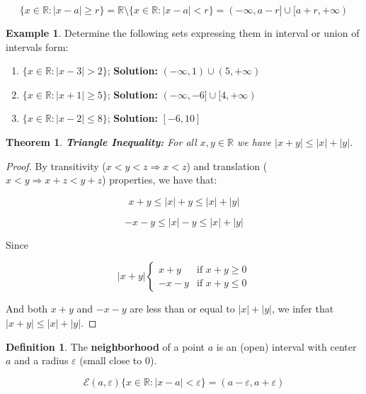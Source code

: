 \documentclass[a4paper,11pt]{article}
\theoremstyle{definition}
\newtheorem{definition}{Definition}
\newtheorem{example}{Example}
\theoremstyle{plain}
\newtheorem{theorem}{Theorem}
\begin{document}
\[
\{x\in\mathbb{R} : \lvert x-a \rvert \geq r\} = \mathbb{R}\setminus\{x\in\mathbb{R}: \lvert x-a \rvert < r\} = (-\infty,a-r]\cup[a+r,+\infty)
\]

\begin{example}
Determine the following sets expressing them in
interval or union of intervals form:
\end{example}

\begin{enumerate}
\def\labelenumi{\arabic{enumi}.}
\item
  \(\{x\in\mathbb{R} : \lvert x-3\rvert > 2\}\); \textbf{Solution:}
  \((-\infty,1)\cup(5,+\infty)\)
\item
  \(\{x\in\mathbb{R} : \lvert x+1\rvert \geq 5\}\); \textbf{Solution:}
  \((-\infty,-6]\cup[4,+\infty)\)
\item
  \(\{x\in\mathbb{R} : \lvert x-2\rvert \leq 8\}\); \textbf{Solution:}
  \([-6,10]\)
\end{enumerate}

\begin{theorem}{\textbf{Triangle Inequality:}}
For all \(x,y\in\mathbb{R}\) we have
\(\lvert x+y \rvert \leq \lvert x \rvert + \lvert y \rvert\).
\end{theorem} 


\begin{proof}
By transitivity (\(x<y<z\Rightarrow x<z\)) and
translation (\(x<y\Rightarrow x+z < y+z\)) properties, we have that:

\[
x+y \leq \lvert x \rvert + y \leq \lvert x \rvert + \lvert y \rvert
\]

\[
-x-y \leq \lvert x \rvert - y \leq \lvert x \rvert + \lvert y \rvert
\]

Since

\[
\lvert x + y\rvert \begin{cases} 
x + y & \text{if } x+y \geq 0 \\
-x-y  & \text{if } x+y \leq 0
\end{cases}
\]

And both \(x+y\) and \(-x-y\) are less than or equal to
\(\lvert x \rvert + \lvert y \rvert\), we infer that
\(\lvert x + y \rvert \leq \lvert x \rvert + \lvert y \rvert\).
\end{proof}


\begin{definition}
The \textbf{neighborhood} of a point \(a\) is an
(open) interval with center \(a\) and a radius \(\varepsilon\) (small
close to \(0\)).

\[
\mathcal{E}(a,\varepsilon) \{x\in\mathbb{R} : \lvert x-a\rvert < \varepsilon\} = (a-\varepsilon,a+\varepsilon)
\]
\end{definition}
\end{document}
